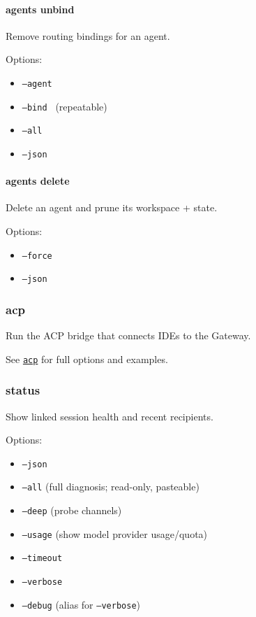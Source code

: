 \paragraph{agents unbind}


Remove routing bindings for an agent.

Options:

\begin{itemize}
  \item \texttt{--agent }
  \item \texttt{--bind } (repeatable)
  \item \texttt{--all}
  \item \texttt{--json}
\end{itemize}


\paragraph{agents delete }


Delete an agent and prune its workspace + state.

Options:

\begin{itemize}
  \item \texttt{--force}
  \item \texttt{--json}
\end{itemize}


\subsubsection{acp}


Run the ACP bridge that connects IDEs to the Gateway.

See \href{/cli/acp}{\texttt{acp}} for full options and examples.

\subsubsection{status}


Show linked session health and recent recipients.

Options:

\begin{itemize}
  \item \texttt{--json}
  \item \texttt{--all} (full diagnosis; read-only, pasteable)
  \item \texttt{--deep} (probe channels)
  \item \texttt{--usage} (show model provider usage/quota)
  \item \texttt{--timeout }
  \item \texttt{--verbose}
  \item \texttt{--debug} (alias for \texttt{--verbose})
\end{itemize}


